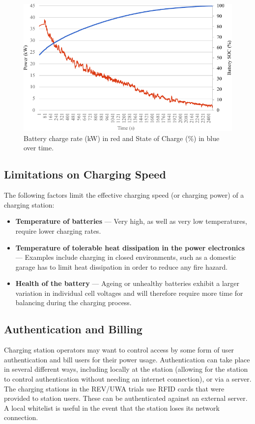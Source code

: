 \begin{figure}[H]
	\centering
	\includegraphics[width=0.7\linewidth]{chargerate}
	\caption[Battery charge rate and State of Charge over time.]{Battery charge rate (kW) in red and State of Charge (\%) in blue over time.}
	\label{fig:10:cr}
\end{figure}

\subsection{Limitations on Charging Speed}
The following factors limit the effective charging speed (or charging power) of a charging station:
\begin{itemize}
	\item \textbf{Temperature of batteries} --- Very high, as well as very low temperatures, require lower charging rates.
	\item \textbf{Temperature of tolerable heat dissipation in the power electronics} --- Examples include charging in closed environments, such as a domestic garage has to limit heat dissipation in order to reduce any fire hazard.
	\item \textbf{Health of the battery} --- Ageing or unhealthy batteries exhibit a larger variation in individual cell voltages and will therefore require more time for balancing during the charging process.
\end{itemize}

\subsection{Authentication and Billing}
Charging station operators may want to control access by some form of user authentication and bill users for their power usage. Authentication can take place in several different ways, including locally at the station (allowing for the station to control authentication without needing an internet connection), or via a server. The charging stations in the REV/UWA trials use RFID cards that were provided to station users. These can be authenticated against an external server. A local whitelist is useful in the event that the station loses its network connection. 

